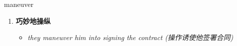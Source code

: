 
\begin{frame}
{\huge maneuver}
\begin{center}
\begin{enumerate}\Large
  \item \textbf{巧妙地操纵}
  \begin{itemize}
    \item \em{\Large{they maneuver him into signing the contract (操作诱使他签署合同)}}
  \end{itemize}
\end{enumerate}
\end{center}
\end{frame}
